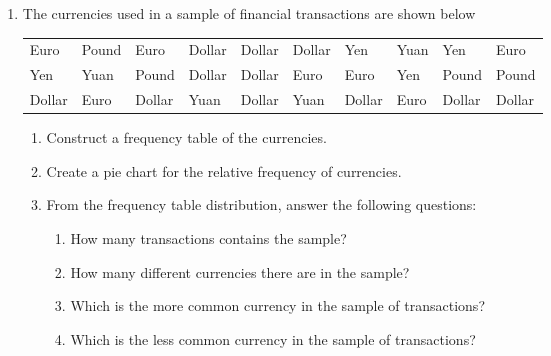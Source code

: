 \begin{enumerate}[leftmargin=*,resume]
\item The currencies used in a sample of financial transactions are shown below
\begin{center}
\begin{tabular}{llllllllll}
Euro & Pound & Euro & Dollar & Dollar & Dollar & Yen & Yuan & Yen & Euro \\
Yen & Yuan & Pound & Dollar & Dollar & Euro & Euro & Yen & Pound & Pound \\
Dollar & Euro & Dollar & Yuan & Dollar & Yuan & Dollar & Euro & Dollar & Dollar
\end{tabular} 
\end{center}
\begin{enumerate}
\item Construct a frequency table of the currencies.
\item Create a pie chart for the relative frequency of currencies. 
\item From the frequency table distribution, answer the following questions:
\begin{enumerate}
\item How many transactions contains the sample?
\item How many different currencies there are in the sample?
\item Which is the more common currency in the sample of transactions?
\item Which is the less common currency in the sample of transactions?
\end{enumerate}
\end{enumerate}



\end{enumerate}
